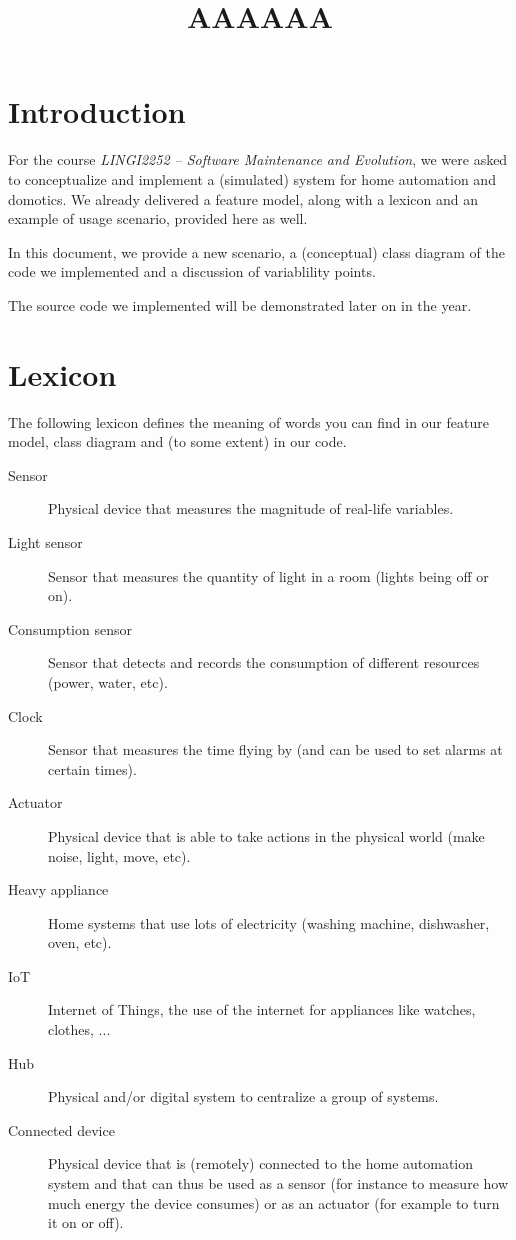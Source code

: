     \title{AAAAAA}
    \newpage

	\section{Introduction}
		For the course \textit{LINGI2252 -- Software Maintenance and Evolution}, we were asked to conceptualize and implement a (simulated) system for home automation and domotics.
		We already delivered a feature model, along with a lexicon and an example of usage scenario, provided here as well.
		
		In this document, we provide a new scenario, a (conceptual) class diagram of the code we implemented and a discussion of variablility points.
		
		The source code we implemented will be demonstrated later on in the year.
	
	\section{Lexicon}
		The following lexicon defines the meaning of words you can find in our feature model, class diagram and (to some extent) in our code.
		
		\begin{description}
            \item[Sensor] Physical device that measures the magnitude of real-life variables.
            \item[Light sensor] Sensor that measures the quantity of light in a room (lights being off or on).
            \item[Consumption sensor] Sensor that detects and records the consumption of different resources (power, water, etc).
            \item[Clock] Sensor that measures the time flying by (and can be used to set alarms at certain times).
            \item[Actuator] Physical device that is able to take actions in the physical world (make noise, light, move, etc).
            \item[Heavy appliance] Home systems that use lots of electricity (washing machine, dishwasher, oven, etc).
            \item[IoT] Internet of Things, the use of the internet for appliances like watches, clothes, ...
            \item[Hub] Physical and/or digital system to centralize a group of systems.
            \item[Connected device] Physical device that is (remotely) connected to the home automation system and that can thus be used as a sensor (for instance to measure how much energy the device consumes) or as an actuator (for example to turn it on or off).
        \end{description}
	

